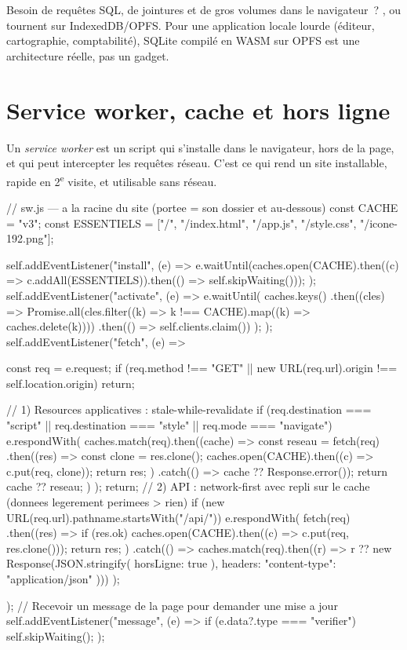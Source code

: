 \begin{astuce}
Besoin de requ\^etes SQL, de jointures et de gros volumes dans le navigateur~?
,  ou
 tournent sur IndexedDB/OPFS. Pour une application locale
lourde (\'editeur, cartographie, comptabilit\'e), SQLite compil\'e en WASM sur OPFS est
une architecture r\'eelle, pas un gadget.
\end{astuce}

\section{Service worker, cache et hors ligne}
\label{sec-pwa}

Un \emph{service worker} est un script qui s'installe dans le navigateur, hors de la page,
et qui peut intercepter les requ\^etes r\'eseau. C'est ce qui rend un site installable, rapide en
2\textsuperscript{e} visite, et utilisable sans r\'eseau.

\begin{codejs}
// sw.js --- a la racine du site (portee = son dossier et au-dessous)
const CACHE = "v3";
const ESSENTIELS = ["/", "/index.html", "/app.js", "/style.css", "/icone-192.png"];

self.addEventListener("install", (e) => {
  e.waitUntil(caches.open(CACHE).then((c) => c.addAll(ESSENTIELS)).then(() => self.skipWaiting()));
});
self.addEventListener("activate", (e) => {
  e.waitUntil(
    caches.keys()
      .then((cles) => Promise.all(cles.filter((k) => k !== CACHE).map((k) => caches.delete(k))))
      .then(() => self.clients.claim())
  );
});
self.addEventListener("fetch", (e) => {
  const req = e.request;
  if (req.method !== "GET" || new URL(req.url).origin !== self.location.origin) return;

  // 1) Resources applicatives : stale-while-revalidate
  if (req.destination === "script" || req.destination === "style" || req.mode === "navigate") {
    e.respondWith(
      caches.match(req).then((cache) => {
        const reseau = fetch(req)
          .then((res) => { const clone = res.clone(); caches.open(CACHE).then((c) => c.put(req, clone)); return res; })
          .catch(() => cache ?? Response.error());
        return cache ?? reseau;
      })
    );
    return;
  }
  // 2) API : network-first avec repli sur le cache (donnees legerement perimees > rien)
  if (new URL(req.url).pathname.startsWith("/api/")) {
    e.respondWith(
      fetch(req)
        .then((res) => { if (res.ok) caches.open(CACHE).then((c) => c.put(req, res.clone())); return res; })
        .catch(() => caches.match(req).then((r) => r ?? new Response(JSON.stringify({ horsLigne: true }), { headers: { "content-type": "application/json" } })))
    );
  }
});
// Recevoir un message de la page pour demander une mise a jour
self.addEventListener("message", (e) => { if (e.data?.type === "verifier") self.skipWaiting(); });
\end{codejs}

